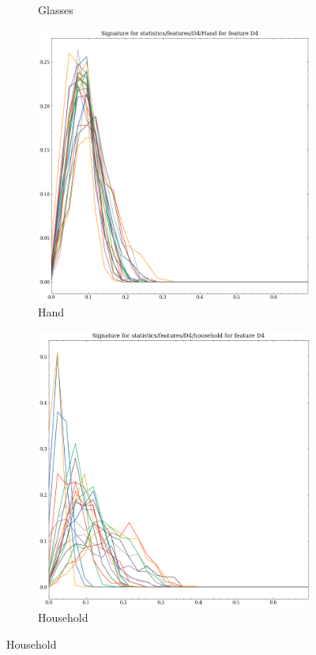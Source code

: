 \begin{figure}[t!p]
\begin{subfigure}[b]{0.23\textwidth}
        \caption{Glasses}
    \end{subfigure}
    \hfill
    \begin{subfigure}[b]{0.23\textwidth}
        \includegraphics[width=\textwidth]{assets/feature_extraction/D4/Hand.png}
        \caption{Hand}
    \end{subfigure}
    \hfill
    \begin{subfigure}[b]{0.23\textwidth}
        \includegraphics[width=\textwidth]{assets/feature_extraction/D4/household.png}
        \caption{Household}
    \end{subfigure}
    \hfill


\end{figure}
